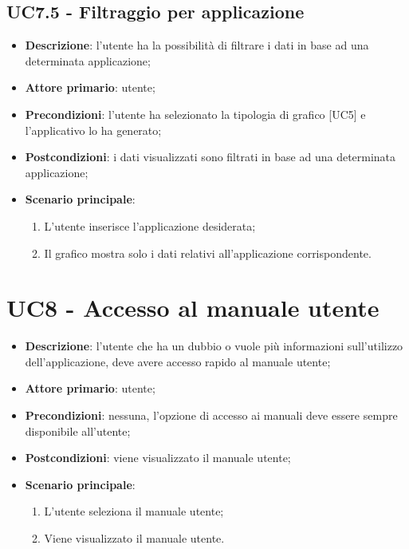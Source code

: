 \subsection{UC7.5 - Filtraggio per applicazione}
\begin{itemize}
  \item \textbf{Descrizione}: l'utente ha la possibilità di filtrare i dati in base ad una determinata applicazione;
  \item \textbf{Attore primario}: utente;
  \item \textbf{Precondizioni}: l'utente ha selezionato la tipologia di grafico [UC5] e l'applicativo lo ha generato;
  \item \textbf{Postcondizioni}: i dati visualizzati sono filtrati in base ad una determinata applicazione;
  \item \textbf{Scenario principale}:
    \begin{enumerate}
      \item L'utente inserisce l'applicazione desiderata;
      \item Il grafico mostra solo i dati relativi all'applicazione corrispondente.
    \end{enumerate}
\end{itemize}


\section{UC8 - Accesso al manuale utente}
\begin{itemize}
  \item \textbf{Descrizione}: l'utente che ha un dubbio o vuole più informazioni sull'utilizzo dell'applicazione, deve avere accesso rapido al manuale utente;
  \item \textbf{Attore primario}: utente;
  \item \textbf{Precondizioni}: nessuna, l'opzione di accesso ai manuali deve essere sempre disponibile all'utente;
  \item \textbf{Postcondizioni}: viene visualizzato il manuale utente;
  \item \textbf{Scenario principale}:
  \begin{enumerate}
    \item L'utente seleziona il manuale utente;
    \item Viene visualizzato il manuale utente.
  \end{enumerate}
\end{itemize}

